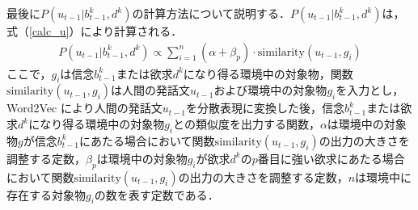 \par
最後に$P(u_{t-1}|b_{t-1}^k,d^k)$の計算方法について説明する．$P(u_{t-1}|b_{t-1}^k,d^k)$は，式（\ref{calc_u}）により計算される．
\begin{equation}
  \begin{split}
  \label{calc_u}
  P(u_{t-1}|b_{t-1}^k,d^k)\propto \sum_{i=1}^n(\alpha+\beta_p)\cdot\mathrm{similarity}(u_{t-1},g_i)
  \end{split}
\end{equation}
ここで，$g_i$は信念$b_{t-1}^k$または欲求$d^k$になり得る環境中の対象物，関数$\mathrm{similarity}(u_{t-1},g_i)$は人間の発話文$u_{t-1}$および環境中の対象物$g_i$を入力とし，Word2Vec \cite{mikolov2013efficient}により人間の発話文$u_{t-1}$を分散表現に変換した後，信念$b_{t-1}^k$または欲求$d^k$になり得る環境中の対象物$g_i$との類似度を出力する関数，$\alpha$は環境中の対象物$g$が信念$b_{t-1}^k$にあたる場合において関数$\mathrm{similarity}(u_{t-1},g_i)$の出力の大きさを調整する定数，$\beta_p$は環境中の対象物$g_i$が欲求$d^k$の$p$番目に強い欲求にあたる場合において関数$\mathrm{similarity}(u_{t-1},g_i)$の出力の大きさを調整する定数，$n$は環境中に存在する対象物$g_i$の数を表す定数である．
